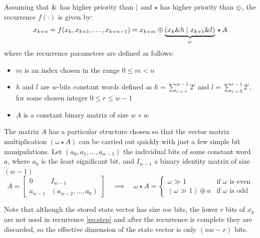 \documentclass[preprint,1p,times]{elsarticle}
\begin{document}
Assuming that $\&$ has higher priority than $\mid$ and $\star$ has higher priority than $\mathbin{\oplus}$, the recurrence $f(\cdot)$ is given by:
\begin{equation}
\label{eq:step}
    x_{k+n} = f(x_{k},x_{k+1}, \dots, x_{k+n-1}) = x_{k+m} \mathbin{\oplus} \underbrace{\left(x_k \& h \mid x_{k+1} \& l\right)}_{\omega}\, \star \,A
\end{equation}
where the recurrence parameters are defined as follows:
\begin{itemize}
	\item $m$ is an index chosen in the range $0 \le m < n$
    \item $h$ and $l$ are $w$-bits constant words defined as $h=\sum_{i=r}^{w-1}2^i$ and $l=\sum_{i=0}^{r-1}2^i$, for some chosen integer $0 \le r \le w-1$
    \item $A$ is a constant binary matrix of size $w \times w$
\end{itemize}

The matrix $A$ has a particular structure chosen so that the vector matrix multiplication $(\omega\star A)$ can be carried out quickly with just a few simple bit manipulations. Let $(a_0, a_1, \dots, a_{w-1})$ the individual bits of some constant word $a$, where $a_0$ is the least significant bit, and $I_{w-1}$ a binary identity matrix of size $(w-1)$
\begin{equation}
\label{eq:matmult}
A = \left[ \begin{matrix} 0 & I_{w - 1} \\ a_{w-1} & (a_{w - 2}, \ldots , a_0) \end{matrix} \right] \quad \implies \quad \omega\star A = \begin{cases}\omega \gg 1 & \text{if $\omega$ is even}\\(\omega \gg 1) \oplus a & \text{if $\omega$ is odd}\end{cases}
\end{equation}

Note that although the stored state vector has size $nw$ bits, the lower $r$ bits of $x_k$ are not used in recurrence \eqref{eq:step} and after the recurrence is complete they are discarded, so the effective dimension of the state vector is only $(nw-r)$ bits. \\ %
\end{document}
